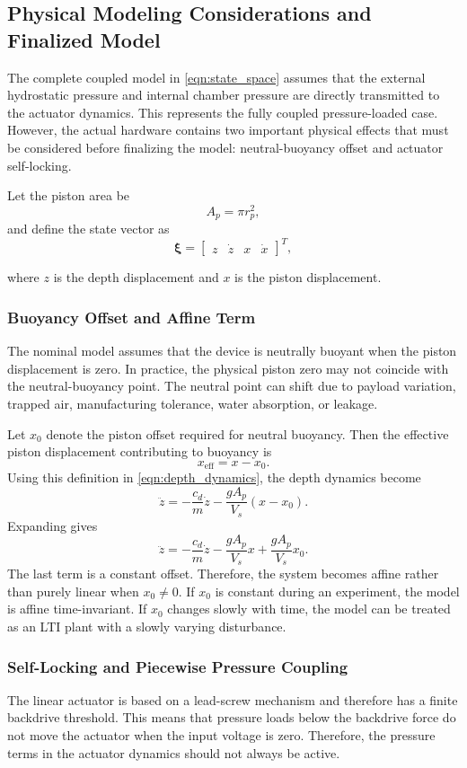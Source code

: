 ﻿\documentclass[subscriptcorrection,upint,varvw,barcolor=Goldenrod3,mathalfa=cal=euler,balance,hyphenate,french,pdf-a]{asmejour}
\begin{document}
\subsection{Physical Modeling Considerations and Finalized Model}

The complete coupled model in \eqref{eqn:state_space} assumes that the external hydrostatic pressure and internal chamber pressure are directly transmitted to the actuator dynamics. This represents the fully coupled pressure-loaded case. However, the actual hardware contains two important physical effects that must be considered before finalizing the model: neutral-buoyancy offset and actuator self-locking.

Let the piston area be
\[
    A_p=\pi r_p^2,
\]
and define the state vector as
\[
    \boldsymbol{\xi}=\begin{bmatrix} z & \dot{z} & x & \dot{x} \end{bmatrix}^T,
\]

where \(z\) is the depth displacement and \(x\) is the piston displacement.

\subsubsection{Buoyancy Offset and Affine Term}

The nominal model assumes that the device is neutrally buoyant when the piston displacement is zero. In practice, the physical piston zero may not coincide with the neutral-buoyancy point. The neutral point can shift due to payload variation, trapped air, manufacturing tolerance, water absorption, or leakage.

Let \(x_0\) denote the piston offset required for neutral buoyancy. Then the effective piston displacement contributing to buoyancy is
\[
    x_{\mathrm{eff}}=x-x_0.
\]
Using this definition in \eqref{eqn:depth_dynamics}, the depth dynamics become
\[
    \ddot{z}=-\frac{c_d}{m}\dot{z}-\frac{gA_p}{V_s}(x-x_0).
\]
Expanding gives
\[
    \ddot{z}=-\frac{c_d}{m}\dot{z}-\frac{gA_p}{V_s}x+\frac{gA_p}{V_s}x_0.
\]
The last term is a constant offset. Therefore, the system becomes affine rather than purely linear when \(x_0\neq 0\). If \(x_0\) is constant during an experiment, the model is affine time-invariant. If \(x_0\) changes slowly with time, the model can be treated as an LTI plant with a slowly varying disturbance.
\subsubsection{Self-Locking and Piecewise Pressure Coupling}
The linear actuator is based on a lead-screw mechanism and therefore has a finite backdrive threshold. This means that pressure loads below the backdrive force do not move the actuator when the input voltage is zero. Therefore, the pressure terms in the actuator dynamics should not always be active.
\end{document}
